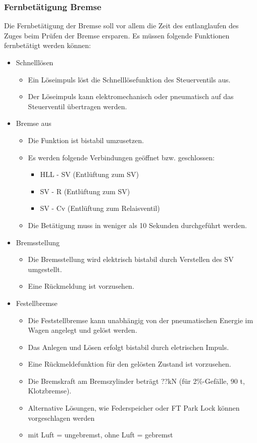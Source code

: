 \subsubsection{Fernbetätigung Bremse}
Die Fernbetätigung der Bremse soll vor allem die Zeit des entlanglaufen des Zuges beim Prüfen der Bremse ersparen. Es müssen folgende Funktionen fernbetätigt werden können:
\begin{itemize}
    \item Schnelllösen
    \begin{itemize}
        \item Ein Löseimpuls löst die Schnelllösefunktion des Steuerventils aus.
        \item Der Löseimpuls kann elektromechanisch oder pneumatisch auf das Steuerventil übertragen werden.
    \end{itemize}
    \item Bremse aus
    \begin{itemize}
        \item Die Funktion ist bistabil umzusetzen.
        \item 	Es werden folgende Verbindungen geöffnet bzw. geschlossen:
        \begin{itemize}
            \item HLL - SV (Entlüftung zum SV)
            \item SV - R (Entlüftung zum SV)
            \item SV - Cv (Entlüftung zum Relaisventil)
        \end{itemize}
        \item Die Betätigung muss in weniger als 10 Sekunden durchgeführt werden.
    \end{itemize}
    \item Bremsstellung
    \begin{itemize}
        \item Die Bremsstellung wird elektrisch bistabil durch Verstellen des SV umgestellt.
        \item Eine Rückmeldung ist vorzusehen.
    \end{itemize}
    \item Festellbremse
    \begin{itemize}
        \item Die Feststellbremse kann unabhängig von der pneumatischen Energie im Wagen angelegt und gelöst werden.
        \item Das Anlegen und Lösen erfolgt bistabil durch eletrischen Impuls.
        \item Eine Rückmeldefunktion für den gelösten Zustand ist vorzusehen.
        \item Die Bremskraft am Bremszylinder beträgt ??kN (für 2\%-Gefälle, 90 t, Klotzbremse).
        \item Alternative Lösungen, wie Federspeicher oder FT Park Lock können vorgeschlagen werden
        \item mit Luft = ungebremst, ohne Luft = gebremst
    \end{itemize}
\end{itemize}
